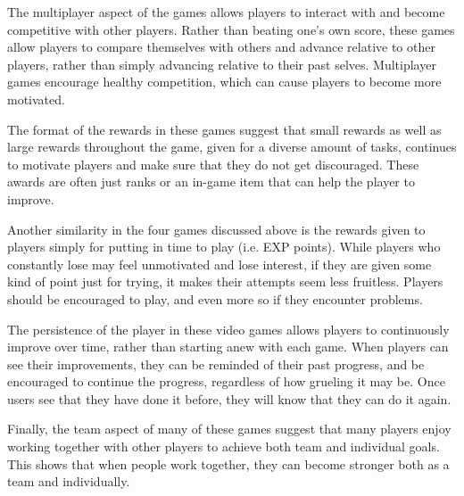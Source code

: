 The multiplayer aspect of the games allows players to interact with and become competitive with other players. Rather than beating one's own score, these games allow players to compare themselves with others and advance relative to other players, rather than simply advancing relative to their past selves. Multiplayer games encourage healthy competition, which can cause players to become more motivated.   

The format of the rewards in these games suggest that small rewards as well as large rewards throughout the game, given for a diverse amount of tasks, continues to motivate players and make sure that they do not get discouraged. These awards are often just ranks or an in-game item that can help the player to improve. 

Another similarity in the four games discussed above is the rewards given to players simply for putting in time to play (i.e. EXP points). While players who constantly lose may feel unmotivated and lose interest, if they are given some kind of point just for trying, it makes their attempts seem less fruitless. Players should be encouraged to play, and even more so if they encounter problems. 

The persistence of the player in these video games allows players to continuously improve over time, rather than starting anew with each game. When players can see their improvements, they can be reminded of their past progress, and be encouraged to continue the progress, regardless of how grueling it may be. Once users see that they have done it before, they will know that they can do it again. 

Finally, the team aspect of many of these games suggest that many players enjoy working together with other players to achieve both team and individual goals. This shows that when people work together, they can become stronger both as a team and individually.